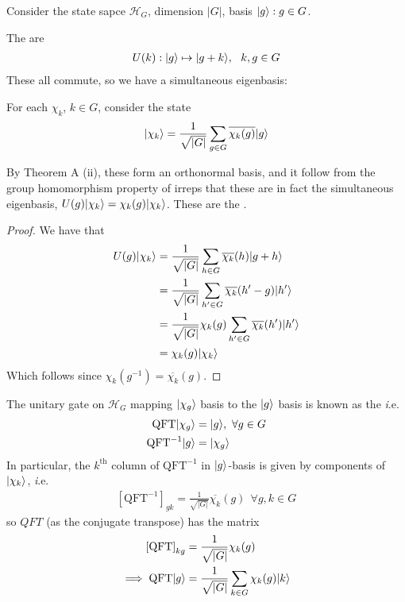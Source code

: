 \documentclass[]{article}
\renewcommand{\it}[1]{\textit{#1}}
\newcommand{\qft}{\textrm{QFT}}
\begin{document}
\begin{defin*}
Consider the state sapce $\mathcal{H}_G$, dimension $|G|$, basis $\lvert g\rangle:g\in G$.

The  are
\begin{align*}
	U(k) : \lvert g\rangle \mapsto \lvert g+k\rangle,\ \ k,g\in G
\end{align*}
These all commute, so we have a simultaneous eigenbasis:

For each $\chi_k$, $k\in G$, consider the state
\begin{align*}
\lvert\chi_k\rangle = \frac{1}{\sqrt{|G|}}\sum_{g\in G}\overline{\chi_k(g)}\lvert g\rangle
\end{align*}

By Theorem A (ii), these form an orthonormal basis, and it follow from the group homomorphism property of irreps that these are in fact the simultaneous eigenbasis, $U(g)\lvert\chi_k\rangle = \chi_k(g)\lvert\chi_k\rangle$. These are the .
\end{defin*}
\begin{proof}
We have that
\begin{align*}
U(g)\lvert\chi_k\rangle &= \frac{1}{\sqrt{|G|}}\sum_{h\in G}\overline{\chi_k}(h)\lvert g+h\rangle\\
&= \frac{1}{\sqrt{|G|}}\sum_{h'\in G}\overline{\chi_k}(h'-g)\lvert h'\rangle\\
&= \frac{1}{\sqrt{|G|}}\chi_k(g)\sum_{h'\in G}\overline{\chi_k}(h')\lvert h'\rangle\\
&= \chi_k(g)\lvert\chi_k\rangle
\end{align*}
Which follows since $\chi_k(g^{-1}) = \overline{\chi_k}(g)$.
\end{proof}
\begin{defin*}
The unitary gate on $\mathcal{H}_G$ mapping $\lvert\chi_g\rangle$ basis to the $\lvert g\rangle$ basis is known as the  {\it i.e.}
\begin{align*}
\qft\ket{\chi_g} &= \ket{g},\ \forall g\in G\\
\qft^{-1}\ket{g} &= \ket{\chi_g}
\end{align*}
In particular, the $k^{\textrm{th}}$ column of $\qft^{-1}$ in $\lvert g\rangle$-basis is given by components of $\lvert\chi_k\rangle$, {\it i.e.}
\begin{align*}
	\left[\qft^{-1}\right]_{gk} = \frac{1}{\sqrt{|G|}}\overline{\chi_k}(g)\ \ \forall g,k\in G
\end{align*}
so $QFT$ (as the conjugate transpose) has the matrix
\begin{align*}
\left[\qft\right]_{kg} &= \frac{1}{\sqrt{|G|}}\chi_k(g)\\
\implies \qft\ket{g} &= \frac{1}{\sqrt{|G|}}\sum_{k\in G}\chi_k(g)\ket{k}
\end{align*}
\end{defin*}
\end{document}
